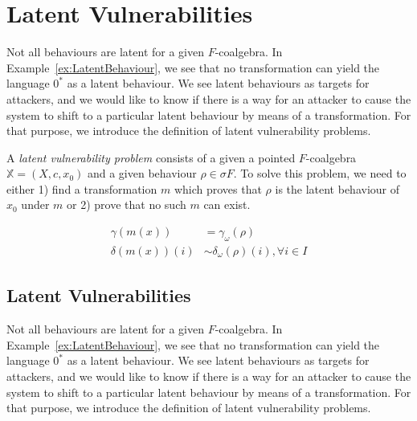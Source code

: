 
\section{Latent Vulnerabilities}
Not all behaviours are latent for a given $F$-coalgebra. In Example~\ref{ex:LatentBehaviour}, we see that no transformation can yield the language $0^*$ as a latent behaviour. We see latent behaviours as targets for attackers, and we would like to know if there is a way for an attacker to cause the system to shift to a particular latent behaviour by means of a transformation. For that purpose, we introduce the definition of {latent vulnerability problems}.

\begin{definition}
A \emph{latent vulnerability problem} consists of a given a pointed $F$-coalgebra $\mathbb{X}=(X,c,x_0)$ and a given behaviour $\rho\in \sigma F$. To solve this problem, we need to either 1) find a transformation $m$ which proves that $\rho$ is the latent behaviour of $x_0$ under $m$ or 2) prove that no such $m$ can exist.
\end{definition}


\begin{align}
\gamma(m(x))&=\gamma_\omega(\rho)\\
\delta(m(x))(i)&\sim \delta_\omega(\rho)(i), \forall i\in I
\end{align}

\subsection{Latent Vulnerabilities}
Not all behaviours are latent for a given $F$-coalgebra. In Example~\ref{ex:LatentBehaviour}, we see that no transformation can yield the language $0^*$ as a latent behaviour. We see latent behaviours as targets for attackers, and we would like to know if there is a way for an attacker to cause the system to shift to a particular latent behaviour by means of a transformation. For that purpose, we introduce the definition of {latent vulnerability problems}.

